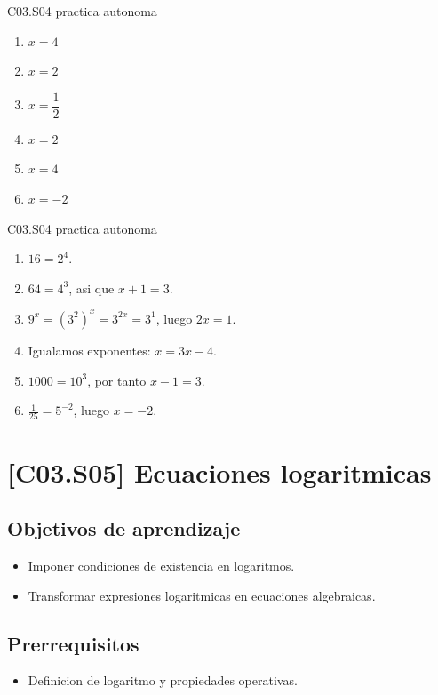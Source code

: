 \begin{shortanswer}{C03.S04 practica autonoma}
\begin{enumerate}[label=\textbf{PX-C03.S04-\arabic*:}, leftmargin=*]
  \item \(x=4\)
  \item \(x=2\)
  \item \(x=\dfrac{1}{2}\)
  \item \(x=2\)
  \item \(x=4\)
  \item \(x=-2\)
\end{enumerate}
\end{shortanswer}

\begin{fullsolution}{C03.S04 practica autonoma}
\begin{enumerate}[label=\textbf{PX-C03.S04-\arabic*:}, leftmargin=*]
  \item \(16=2^4\).
  \item \(64=4^3\), asi que \(x+1=3\).
  \item \(9^x=(3^2)^x=3^{2x}=3^1\), luego \(2x=1\).
  \item Igualamos exponentes: \(x=3x-4\).
  \item \(1000=10^3\), por tanto \(x-1=3\).
  \item \(\tfrac{1}{25}=5^{-2}\), luego \(x=-2\).
\end{enumerate}
\end{fullsolution}

\section{[C03.S05] Ecuaciones logaritmicas}

\subsection*{Objetivos de aprendizaje}
\begin{itemize}
  \item Imponer condiciones de existencia en logaritmos.
  \item Transformar expresiones logaritmicas en ecuaciones algebraicas.
\end{itemize}

\subsection*{Prerrequisitos}
\begin{itemize}
  \item Definicion de logaritmo y propiedades operativas.
\end{itemize}

